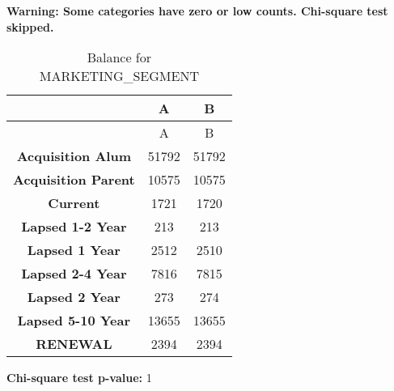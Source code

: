 \documentclass[
]{article}
\begin{document}
\textbf{Warning: Some categories have zero or low counts. Chi-square
test skipped.} \pagebreak

\begin{longtable}[]{@{}ccc@{}}
\caption{Balance for MARKETING\_SEGMENT}\tabularnewline
\toprule\noalign{}
~ & A & B \\
\midrule\noalign{}
\endfirsthead
\toprule\noalign{}
~ & A & B \\
\midrule\noalign{}
\endhead
\bottomrule\noalign{}
\endlastfoot
\textbf{Acquisition Alum} & 51792 & 51792 \\
\textbf{Acquisition Parent} & 10575 & 10575 \\
\textbf{Current} & 1721 & 1720 \\
\textbf{Lapsed 1-2 Year} & 213 & 213 \\
\textbf{Lapsed 1 Year} & 2512 & 2510 \\
\textbf{Lapsed 2-4 Year} & 7816 & 7815 \\
\textbf{Lapsed 2 Year} & 273 & 274 \\
\textbf{Lapsed 5-10 Year} & 13655 & 13655 \\
\textbf{RENEWAL} & 2394 & 2394 \\
\end{longtable}

\textbf{Chi-square test p-value:} 1\\
\pagebreak
\end{document}

